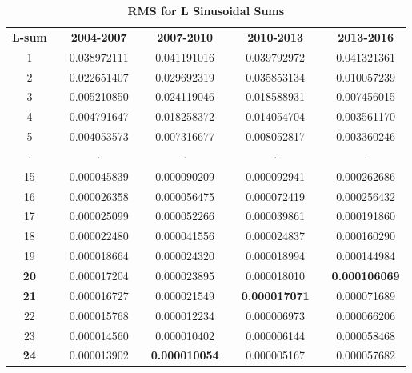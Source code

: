 \documentclass[12pt,halfline,a4paper]{ouparticle}
\begin{document}
\begin{table}[h]
	\centering
	\caption{\textbf{RMS for L Sinusoidal Sums}}
	\begin{tabular}{ccccccccc}
		\toprule
		\toprule
		\textbf{L-sum} &       & \textbf{2004-2007} &       & \textbf{2007-2010} &       & \textbf{2010-2013} &       & \textbf{2013-2016} \\
		\cmidrule{1-1}\cmidrule{3-3}\cmidrule{5-5}\cmidrule{7-7}\cmidrule{9-9}
		1     &       & 0.038972111 &       & 0.041191016 &       & 0.039792972 &       & 0.041321361 \\
		2     &       & 0.022651407 &       & 0.029692319 &       & 0.035853134 &       & 0.010057239 \\
		3     &       & 0.005210850 &       & 0.024119046 &       & 0.018588931 &       & 0.007456015 \\
		4     &       & 0.004791647 &       & 0.018258372 &       & 0.014054704 &       & 0.003561170 \\
		5     &       & 0.004053573 &       & 0.007316677 &       & 0.008052817 &       & 0.003360246 \\
		$\cdot$     &       & $\cdot$     &       & $\cdot$     &       & $\cdot$     &       & $\cdot$ \\
		15    &       & 0.000045839 &       & 0.000090209 &       & 0.000092941 &       & 0.000262686 \\
		16    &       & 0.000026358 &       & 0.000056475 &       & 0.000072419 &       & 0.000256432 \\
		17    &       & 0.000025099 &       & 0.000052266 &       & 0.000039861 &       & 0.000191860 \\
		18    &       & 0.000022480 &       & 0.000041556 &       & 0.000024837 &       & 0.000160290 \\
		19    &       & 0.000018664 &       & 0.000024320 &       & 0.000018994 &       & 0.000144984 \\
		\textbf{20} &       & 0.000017204 &       & 0.000023895 &       & 0.000018010 &       & \textbf{0.000106069} \\
		\textbf{21} &       & 0.000016727 &       & 0.000021549 &       & \textbf{0.000017071} &       & 0.000071689 \\
		22    &       & 0.000015768 &       & 0.000012234 &       & 0.000006973 &       & 0.000066206 \\
		23    &       & 0.000014560 &       & 0.000010402 &       & 0.000006144 &       & 0.000058468 \\
		\textbf{24} &       & 0.000013902 &       & \textbf{0.000010054} &       & 0.000005167 &       & 0.000057682 \\

\end{tabular}
\end{table}
\end{document}
